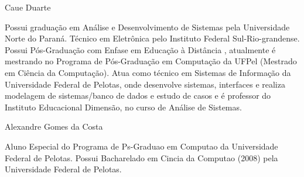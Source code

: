 \documentclass[12pt,a4paper,compsoc]{IEEEtran}
\begin{document}





\begin{IEEEbiography}{Caue Duarte}

  Possui graduação em Análise e Desenvolvimento de Sistemas pela Universidade Norte do Paraná.
  Técnico em Eletrônica pelo Instituto Federal Sul-Rio-grandense. Possui Pós-Graduação com Enfase
  em Educação à Distância , atualmente é mestrando no Programa de Pós-Graduação em Computação da
  UFPel (Mestrado em Ciência da Computação). Atua como técnico em Sistemas de Informação da
  Universidade Federal de Pelotas, onde desenvolve sistemas, interfaces e realiza modelagem de
  sistemas/banco de dados e estudo de casos e é professor do Instituto Educacional Dimensão, no
  curso de Análise de Sistemas. 
\end{IEEEbiography}

\begin{IEEEbiography}{Alexandre Gomes da Costa}

  Aluno Especial do Programa de Ps-Graduao em Computao da Universidade Federal de Pelotas. Possui
  Bacharelado em Cincia da Computao (2008) pela Universidade Federal de Pelotas.
  
\end{IEEEbiography}
\end{document}
